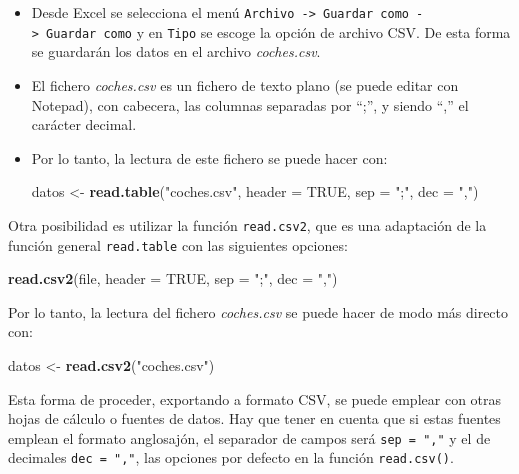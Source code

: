 \documentclass[
]{book}
\newenvironment{Shaded}{\begin{snugshade}}{\end{snugshade}}
\newcommand{\DataTypeTok}[1]{\textcolor[rgb]{0.13,0.29,0.53}{#1}}
\newcommand{\KeywordTok}[1]{\textcolor[rgb]{0.13,0.29,0.53}{\textbf{#1}}}
\newcommand{\NormalTok}[1]{#1}
\newcommand{\OtherTok}[1]{\textcolor[rgb]{0.56,0.35,0.01}{#1}}
\newcommand{\StringTok}[1]{\textcolor[rgb]{0.31,0.60,0.02}{#1}}
\begin{document}
\begin{itemize}
\item
  Desde Excel se selecciona el menú
  \texttt{Archivo\ -\textgreater{}\ Guardar\ como\ -\textgreater{}\ Guardar\ como} y en \texttt{Tipo} se escoge la opción de
  archivo CSV. De esta forma se guardarán los datos en el archivo
  \emph{coches.csv}.
\item
  El fichero \emph{coches.csv} es un fichero de texto plano (se puede
  editar con Notepad), con cabecera, las columnas separadas por ``;'', y
  siendo ``,'' el carácter decimal.
\item
  Por lo tanto, la lectura de este fichero se puede hacer con:

\begin{Shaded}
\begin{Highlighting}[]
\NormalTok{datos <-}\StringTok{ }\KeywordTok{read.table}\NormalTok{(}\StringTok{"coches.csv"}\NormalTok{, }\DataTypeTok{header =} \OtherTok{TRUE}\NormalTok{, }\DataTypeTok{sep =} \StringTok{";"}\NormalTok{, }\DataTypeTok{dec =} \StringTok{","}\NormalTok{)}
\end{Highlighting}
\end{Shaded}
\end{itemize}

Otra posibilidad es utilizar la función \texttt{read.csv2}, que es
una adaptación de la función general \texttt{read.table} con las siguientes
opciones:

\begin{Shaded}
\begin{Highlighting}[]
\KeywordTok{read.csv2}\NormalTok{(file, }\DataTypeTok{header =} \OtherTok{TRUE}\NormalTok{, }\DataTypeTok{sep =} \StringTok{";"}\NormalTok{, }\DataTypeTok{dec =} \StringTok{","}\NormalTok{)}
\end{Highlighting}
\end{Shaded}

Por lo tanto, la lectura del fichero \emph{coches.csv} se puede hacer de modo
más directo con:

\begin{Shaded}
\begin{Highlighting}[]
\NormalTok{datos <-}\StringTok{ }\KeywordTok{read.csv2}\NormalTok{(}\StringTok{"coches.csv"}\NormalTok{)}
\end{Highlighting}
\end{Shaded}

Esta forma de proceder, exportando a formato CSV, se puede emplear con otras hojas de cálculo o fuentes de datos.
Hay que tener en cuenta que si estas fuentes emplean el formato anglosajón, el separador de campos será \texttt{sep\ =\ ","} y el de decimales \texttt{dec\ =\ ","}, las opciones por defecto en la función \texttt{read.csv()}.
\end{document}
